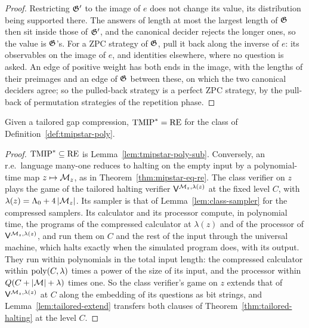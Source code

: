 \begin{proof}
\leanok
Restricting $\mathfrak{G}'$ to the image of $e$ does not change its value, its distribution being
supported there. The answers of length at most the largest length of $\mathfrak{G}$ then sit inside
those of $\mathfrak{G}'$, and the canonical decider rejects the longer ones, so the value is $\mathfrak{G}$'s.
For a ZPC strategy of $\mathfrak{G}$, pull it back along the inverse of $e$: its observables on the
image of $e$, and identities elsewhere, where no question is asked. An edge of positive weight
has both ends in the image, with the lengths of their preimages and an edge of $\mathfrak{G}$ between
these, on which the two canonical deciders agree; so the pulled-back strategy is a perfect ZPC
strategy, by the pull-back of permutation strategies of the repetition phase.
\end{proof}

\begin{theorem}[$\mathrm{TMIP}^* = \RE$ for the polynomial-time class; II:787, II:1505]
\label{thm:tmipstar-poly-eq-re}
\leanok
Given a tailored gap compression, $\mathrm{TMIP}^* = \RE$ for the class of
Definition~\ref{def:tmipstar-poly}.
\end{theorem}

\begin{proof}
\leanok
$\mathrm{TMIP}^* \subseteq \mathrm{RE}$ is Lemma~\ref{lem:tmipstar-poly-sub}. Conversely, an r.e.\
language many-one reduces to halting on the empty input by a polynomial-time map
$z \mapsto \mathcal{M}_z$, as in Theorem~\ref{thm:mipstar-eq-re}. The class verifier on $z$ plays the
game of the tailored halting verifier $\mathsf{V}^{\mathcal{M}_z, \lambda(z)}$ at the fixed level
$C$, with $\lambda(z) = \Lambda_0 + 4\left\vert {\mathcal{M}_z} \right\vert$. Its sampler is that of
Lemma~\ref{lem:class-sampler} for the compressed samplers. Its calculator and its processor
compute, in polynomial time, the programs of the compressed calculator at $\lambda(z)$ and of the
processor of $\mathsf{V}^{\mathcal{M}_z, \lambda(z)}$, and run them on $C$ and the rest of the input
through the universal machine, which halts exactly when the simulated program does, with its
output. They run within polynomials in the total input length: the compressed calculator within
$\mathrm{poly}(C, \lambda)$ times a power of the size of its input, and the processor within
$Q(C + \left\vert {\mathcal{M}} \right\vert + \lambda)$ times one. So the class verifier's game on $z$ extends that of
$\mathsf{V}^{\mathcal{M}_z, \lambda(z)}$ at $C$ along the embedding of its questions as bit strings,
and Lemma~\ref{lem:tailored-extend} transfers both clauses of
Theorem~\ref{thm:tailored-halting} at the level $C$.
\end{proof}

